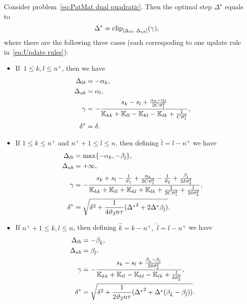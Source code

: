 \begin{theorem}\label{thm:Update rule PatMat with quadratic loss}
  Consider problem~\eqref{eq:PatMat dual quadratic}. Then the optimal step $\Delta^\star$ equals to
  \begin{equation}\label{eq:Delta_optimal2}
    \Delta^{*} = \clip{\Delta_{lb}}{\Delta_{ub}}{\gamma},
  \end{equation}
  where there are the following three cases (each correspoding to one update rule in~\eqref{eq:Update rules}):
  \begin{itemize}
    \item If~$1\le k, l \le n^+$, then we have
    \begin{align*}
      \Delta_{lb} & = -\alpha_k, \\
      \Delta_{ub} & = \alpha_l, \\
      \gamma      & = -\frac{s_k - s_l + \frac{\alpha_k - \alpha_l}{2C\vartheta_1^2}}{\mathbb{K}_{kk} + \mathbb{K}_{ll} - \mathbb{K}_{kl} - \mathbb{K}_{lk} + \frac{1}{C\vartheta_1^2}}, \\
      \delta^{*}  & = \delta.
    \end{align*}
    \item If $1 \le k \le n^+$ and $n^+ + 1 \le l \le n$, then defining $\hat{l} = l - n^+$ we have
    \begin{align*}
      \Delta_{lb} & = \max\{- \alpha_k, - \beta_{\hat{l}}\}, \\
      \Delta_{ub} & = +\infty, \\
      \gamma      & = -\frac{s_k + s_l  - \frac{1}{\vartheta_1} + \frac{\alpha_k}{2C\vartheta_1^2} - \frac{1}{\vartheta_2} + \frac{\beta_{\hat{l}}}{2\delta\vartheta_2^2}}{\mathbb{K}_{kk} + \mathbb{K}_{ll} + \mathbb{K}_{kl} + \mathbb{K}_{lk} + \frac{1}{2C\vartheta_1^2} + \frac{1}{2\delta\vartheta_2^2}}, \\
      \delta^{*}  & = \sqrt{\delta^2 + \frac{1}{4 \vartheta_2 n \tau}({\Delta^{*}}^2 + 2 \Delta^{*} \beta_{\hat{l}})}.
    \end{align*}
    \item If $n^+ + 1\le k,l \le n$, then defining $\hat{k} = k - n^+,$ $\hat{l} = l - n^+$ we have
    \begin{align*}
      \Delta_{lb} & = - \beta_{\hat{k}}, \\
      \Delta_{ub} & = \beta_{\hat{l}}, \\
      \gamma      & = -\frac{s_k - s_l + \frac{\beta_{\hat{k}} - \beta_{\hat{l}}}{2\delta \vartheta_2^2}}{\mathbb{K}_{kk} + \mathbb{K}_{ll} - \mathbb{K}_{kl} - \mathbb{K}_{lk} + \frac{1}{\delta \vartheta_2^2}}, \\
      \delta^{*}  & = \sqrt{\delta^2 + \frac{1}{2 \vartheta_2 n \tau}({\Delta^{*}}^2 + \Delta^{*} (\beta_{\hat{k}} - \beta_{\hat{l}}))}.
    \end{align*}
  \end{itemize}
\end{theorem}

